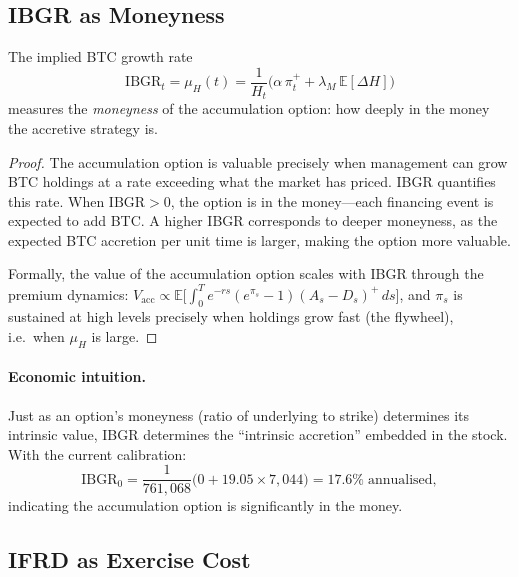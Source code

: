 \subsection{IBGR as Moneyness}\label{ssec:ibgr-moneyness}

\begin{proposition}\label{prop:ibgr-moneyness}
The implied BTC growth rate
$$
  \mathrm{IBGR}_t = \mu_H(t)
  = \frac{1}{H_t}\bigl(\alpha\,\pi_t^+ + \lambda_M\,\mathbb{E}[\Delta H]\bigr)
$$
measures the \emph{moneyness} of the accumulation option: how deeply in the
money the accretive strategy is.
\end{proposition}

\begin{proof}
The accumulation option is valuable precisely when management can grow BTC
holdings at a rate exceeding what the market has priced.  IBGR quantifies
this rate.  When $\mathrm{IBGR} > 0$, the option is in the money---each
financing event is expected to add BTC.  A higher IBGR corresponds to
deeper moneyness, as the expected BTC accretion per unit time is larger,
making the option more valuable.

Formally, the value of the accumulation option scales with IBGR through the
premium dynamics: $V_{\mathrm{acc}} \propto \mathbb{E}\bigl[\int_0^T
e^{-rs}(e^{\pi_s}-1)(A_s - D_s)^+\,ds\bigr]$, and $\pi_s$ is sustained at
high levels precisely when holdings grow fast (the flywheel), i.e.\ when
$\mu_H$ is large.
\end{proof}

\paragraph{Economic intuition.}
Just as an option's moneyness (ratio of underlying to strike) determines
its intrinsic value, IBGR determines the ``intrinsic accretion'' embedded in
the stock.  With the current calibration:
$$
  \mathrm{IBGR}_0
  = \frac{1}{761{,}068}\bigl(0 + 19.05 \times 7{,}044\bigr)
  = 17.6\%\;\text{annualised},
$$
indicating the accumulation option is significantly in the money.

\subsection{IFRD as Exercise Cost}\label{ssec:ifrd-strike}

